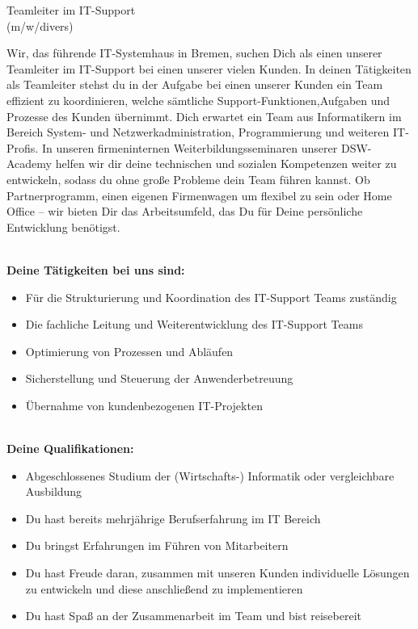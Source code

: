 \documentclass[12pt,utf8]{scrartcl}
\begin{document}
\large
\begin{center} Teamleiter im IT-Support\\(m/w/divers)\end{center} 

\scriptsize
Wir, das führende IT-Systemhaus in Bremen, suchen Dich als einen unserer Teamleiter im IT-Support bei einen unserer vielen Kunden. In deinen Tätigkeiten als Teamleiter stehst du in der Aufgabe bei einen unserer Kunden ein Team effizient zu koordinieren, welche sämtliche Support-Funktionen,Aufgaben und Prozesse des Kunden übernimmt. Dich erwartet ein Team aus Informatikern im Bereich System- und Netzwerkadministration, Programmierung und weiteren IT-Profis. In unseren firmeninternen Weiterbildungsseminaren unserer DSW-Academy helfen wir dir deine technischen und sozialen Kompetenzen weiter zu entwickeln, sodass du ohne große Probleme dein Team führen kannst. Ob Partnerprogramm, einen eigenen Firmenwagen um flexibel zu sein oder Home Office – wir bieten Dir das Arbeitsumfeld, das Du für Deine persönliche Entwicklung benötigst.


\textbf{\\Deine Tätigkeiten bei uns sind:}
\begin{center}
	\begin{itemize}
		\item Für die Strukturierung und Koordination des IT-Support Teams zuständig
		\item Die fachliche Leitung und Weiterentwicklung des IT-Support Teams
		\item Optimierung von Prozessen und Abläufen 
		\item Sicherstellung und Steuerung der Anwenderbetreuung
		\item Übernahme von kundenbezogenen IT-Projekten
	\end{itemize}
\end{center}

\textbf{\\Deine Qualifikationen:}
\begin{center}
	\begin{itemize}
		\item Abgeschlossenes Studium der (Wirtschafts-) Informatik oder vergleichbare Ausbildung
		\item Du hast bereits mehrjährige Berufserfahrung im IT Bereich
		\item Du bringst Erfahrungen im Führen von Mitarbeitern
		\item Du hast Freude daran, zusammen mit unseren Kunden individuelle Lösungen zu entwickeln und diese anschließend zu implementieren
		\item Du hast Spaß an der Zusammenarbeit im Team und bist reisebereit
	\end{itemize}
\end{center}
\end{document}
